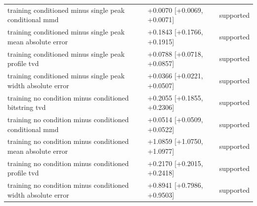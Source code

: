 \begin{table}[p]
\begin{tabular}{@{}p{}p{}p{}@{}}
training conditioned minus single peak conditional mmd & +0.0070 [+0.0069, +0.0071] & supported \\
training conditioned minus single peak mean absolute error & +0.1843 [+0.1766, +0.1915] & supported \\
training conditioned minus single peak profile tvd & +0.0788 [+0.0718, +0.0857] & supported \\
training conditioned minus single peak width absolute error & +0.0366 [+0.0221, +0.0507] & supported \\
training no condition minus conditioned bitstring tvd & +0.2055 [+0.1855, +0.2306] & supported \\
training no condition minus conditioned conditional mmd & +0.0514 [+0.0509, +0.0522] & supported \\
training no condition minus conditioned mean absolute error & +1.0859 [+1.0750, +1.0977] & supported \\
training no condition minus conditioned profile tvd & +0.2170 [+0.2015, +0.2418] & supported \\
training no condition minus conditioned width absolute error & +0.8941 [+0.7986, +0.9503] & supported \\
\bottomrule
\end{tabular}
\end{table}
\clearpage
